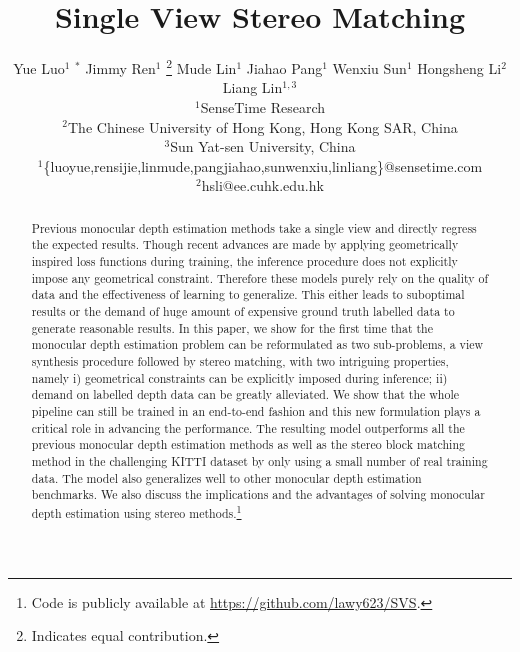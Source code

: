 \documentclass[10pt,twocolumn,letterpaper]{article}
\begin{document}
\title{Single View Stereo Matching}


\author{
Yue Luo$^1$ $^*$ \hspace{0.03in} Jimmy Ren$^1$ \thanks{Indicates equal contribution.} \hspace{0.03in} Mude Lin$^1$ \hspace{0.03in} Jiahao Pang$^1$ \hspace{0.03in} Wenxiu Sun$^1$ \hspace{0.03in} Hongsheng Li$^2$ \hspace{0.03in} Liang Lin$^{1,3}$\\
$^1$SenseTime Research\\
$^2$The Chinese University of Hong Kong, Hong Kong SAR, China\\
$^3$Sun Yat-sen University, China\\
$^1$\{luoyue,rensijie,linmude,pangjiahao,sunwenxiu,linliang\}@sensetime.com\\
$^2$hsli@ee.cuhk.edu.hk\\
}



\maketitle
\thispagestyle{empty}

  
\begin{abstract}
   Previous monocular depth estimation methods take a single view and directly regress the expected results. Though recent advances are made by applying geometrically inspired loss functions during training, the inference procedure does not explicitly impose any geometrical constraint. Therefore these models purely rely on the quality of data and the effectiveness of learning to generalize. This either leads to suboptimal results or the demand of huge amount of expensive ground truth labelled data to generate reasonable results. In this paper, we show for the first time that the monocular depth estimation problem can be reformulated as two sub-problems, a view synthesis procedure followed by stereo matching, with two intriguing properties, namely i) geometrical constraints can be explicitly imposed during inference; ii) demand on labelled depth data can be greatly alleviated. We show that the whole pipeline can still be trained in an end-to-end fashion and this new formulation plays a critical role in advancing the performance. The resulting model outperforms all the previous monocular depth estimation methods as well as the stereo block matching method in the challenging KITTI dataset by only using a small number of real training data. The model also generalizes well to other monocular depth estimation benchmarks. We also discuss the implications and the advantages of solving monocular depth estimation using stereo methods.\footnote{Code is publicly available at \url{https://github.com/lawy623/SVS}.}
\end{abstract}
\end{document}
